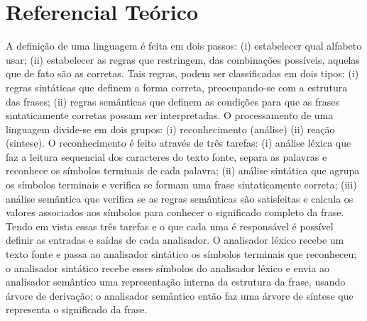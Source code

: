 \chapter{Referencial Teórico}
A definição de uma linguagem é feita em dois passos: (i) estabelecer qual alfabeto usar;       (ii) estabelecer as regras que restringem, das combinações possíveis, aquelas que de fato são as corretas. Tais regras, podem ser classificadas em dois tipos: (i) regras sintáticas que definem a forma correta, preocupando-se com a estrutura das frases; (ii) regras semânticas que definem as condições para que as frases sintaticamente corretas possam ser interpretadas.
O processamento de uma linguagem divide-se em dois grupos: (i) reconhecimento (análise) (ii) reação (sintese). O reconhecimento é feito através de três tarefas: (i) análise léxica que faz a leitura sequencial dos caracteres do texto fonte, separa as palavras e reconhece os símbolos terminais de cada palavra; (ii) análise sintática que agrupa os símbolos terminais e verifica se formam uma frase sintaticamente correta; (iii) análise semântica que verifica se as regras semânticas são satisfeitas e calcula os valores associados aos símbolos para conhecer o significado completo da frase. Tendo em vista essas três tarefas e o que cada uma é responsável é possível definir as entradas e saídas de cada analisador. O analisador léxico recebe um texto fonte e passa ao analisador sintático os símbolos terminais que reconheceu;  o analisador sintático recebe esses símbolos do analisador léxico e envia ao analisador semântico uma representação interna da estrutura da frase, usando árvore de derivação; o analisador semântico então faz uma árvore de síntese que representa  o significado da frase.

